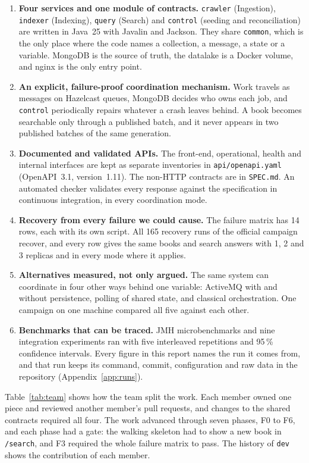 \documentclass[11pt,a4paper]{article}
\newcommand{\code}[1]{\nolinkurl{#1}}
\begin{document}
\begin{enumerate}
\item \textbf{Four services and one module of contracts.} \code{crawler} (Ingestion), \code{indexer} (Indexing),
  \code{query} (Search) and \code{control} (seeding and reconciliation) are written in Java~25 with Javalin and
  Jackson. They share \code{common}, which is the only place where the code names a collection, a message, a state or a
  variable. MongoDB is the source of truth, the datalake is a Docker volume, and nginx is the only entry point.
\item \textbf{An explicit, failure-proof coordination mechanism.} Work travels as messages on Hazelcast queues, MongoDB
  decides who owns each job, and \code{control} periodically repairs whatever a crash leaves behind. A book becomes
  searchable only through a published batch, and it never appears in two published batches of the same generation.
\item \textbf{Documented and validated APIs.} The front-end, operational, health and internal interfaces are kept as
  separate inventories in \code{api/openapi.yaml} (OpenAPI~3.1, version~1.11). The non-HTTP contracts are in
  \code{SPEC.md}. An automated checker validates every response against the specification in continuous integration,
  in every coordination mode.
\item \textbf{Recovery from every failure we could cause.} The failure matrix has 14 rows, each with its own script. All
  165 recovery runs of the official campaign recover, and every row gives the same books and search answers with 1, 2
  and 3 replicas and in every mode where it applies.
\item \textbf{Alternatives measured, not only argued.} The same system can coordinate in four other ways behind one
  variable: ActiveMQ with and without persistence, polling of shared state, and classical orchestration. One campaign
  on one machine compared all five against each other.
\item \textbf{Benchmarks that can be traced.} JMH microbenchmarks and nine integration experiments ran with five
  interleaved repetitions and 95\,\% confidence intervals. Every figure in this report names the run it comes from,
  and that run keeps its command, commit, configuration and raw data in the repository (Appendix~\ref{app:runs}).
\end{enumerate}

Table~\ref{tab:team} shows how the team split the work. Each member owned one piece and reviewed another member's pull
requests, and changes to the shared contracts required all four. The work advanced through seven phases, F0 to F6,
and each phase had a gate: the walking skeleton had to show a new book in \code{/search}, and F3 required the whole
failure matrix to pass. The history of \code{dev} shows the contribution of each member.
\end{document}
